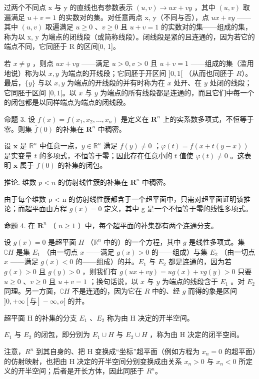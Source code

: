 过两个不同点 x 与 y 的直线也有参数表示 \((u, v) \to ux + vy\) ，其中 \((u, v)\) 取遍满足 \(u + v = 1\) 的实数对的集。对任意两点 x, y（不同与否），点 \(ux + vy\) ——其中 \((u, v)\) 取遍满足 \(u \geqslant 0\) 、\(v \geqslant 0\) 且 \(u + v = 1\) 的实数对的集——组成的集，称为以 x, y 为端点的闭线段（或简称线段）。闭线段是紧的且连通的，因为若它的端点不同，它同胚于 R 的区间{[}0, 1{]}。

若 \(x \neq y\) ，则点 \(ux + vy\) ——满足 \(u > 0, v > 0\) 且 \(u + v = 1\) ——组成的集（滥用地说）称为以 \(x, y\) 为端点的开线段；它同胚于开区间 \(]0, 1[\) （从而也同胚于 \(R\)）。最后，\(\{y\}\) 与以 \(x, y\) 为端点的开线段的并有时称为在 \(x\) 处开、在 \(y\) 处闭的线段；它同胚于区间 \([0, 1[\)。以 \(x\) 与 \(y\) 为端点的所有线段都是连通的，而且它们中每一个的闭包都是以同样端点为端点的闭线段。

命题 3. 设 \(f(x) = f(x_1, x_2, \ldots, x_n)\) 是定义在 \(\mathbf{R}^n\) 上的实系数多项式，不恒等于零。则集 \(\overline{f}(0)\) 的补集在 \(\mathbf{R}^n\) 中稠密。

设 \(\pmb{x}\) 是 \(\mathbb{R}^n\) 中任意一点，\(y \in \mathbb{R}^n\) 满足 \(f(y) \neq 0\) ；\(\varphi(t) = f(x + t(y - x))\) 是实变量 \(t\) 的多项式，不恒等于零；因此存在任意小的 \(t\) 值使 \(\varphi(t) \neq 0\) 。这表明 \(\pmb{x}\) 属于 \(\overline{f}(0)\) 的补集的闭包。

推论. 维数 \(p < n\) 的仿射线性簇的补集在 \(\mathbf{R}^n\) 中稠密。

由于每个维数 p \textless{} n 的仿射线性簇都含于一个超平面中，只需对超平面证明该推论；而超平面由方程 \(g(x) = 0\) 定义，其中 g 是一个不恒等于零的线性多项式。

命题 4. 在 \(\mathbf{R}^n\) （ \(n \geqslant 1\) ）中，每个超平面的补集都有两个连通分支。

设 \(g(x) = 0\) 是超平面 \(H\) （\(\mathbb{R}^n\) 中的）的一个方程，其中 \(g\) 是线性多项式。集 \(\complement H\) 是集 \(E_1\) （由一切点 \(x\) ——满足 \(g(x) > 0\) 的——组成）与集 \(E_2\) （由一切点 \(x\) ——满足 \(g(x) < 0\) 的——组成）的并。\(E_1\) 与 \(E_2\) 都是连通的，因为若 \(g(x) > 0\) 且 \(g(y) > 0\) ，则我们有 \(g(ux + vy) = ug(x) + vg(y) > 0\) 只要 \(u \geqslant 0\) 、\(v \geqslant 0\) 且 \(u + v = 1\) ；换句话说，以 \(x\) 与 \(y\) 为端点的线段含于 \(E_1\) 。对 \(E_2\) 同理。另一方面，\(\complement H\) 不是连通的，因为它在 \(R\) 中的、经 \(g\) 而得的象是区间 \(]0, +\infty[ \text{与}] - \infty, o[\) 的并。

超平面 H 的补集的分支 \(E_{1}\) 、\(E_{2}\) 称为由 H 决定的开半空间。

\(E_{1}\) 与 \(E_{2}\) 的闭包，即分别为 \(E_{1} \cup H\) 与 \(E_{2} \cup H\) ，称为由 H 决定的闭半空间。

注意，\(R^{n}\) 到其自身的、把 H 变换成“坐标”超平面（例如方程为 \(x_{n}=0\) 的超平面）的仿射映射，也把由 H 决定的开半空间分别变换成由关系 \(x_{n}>0\) 与 \(x_{n}<0\) 所定义的开半空间；后者是开长方体，因此同胚于 \(R^{n}\)。


